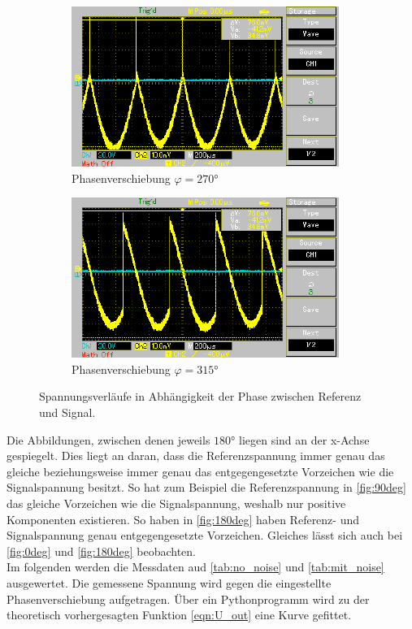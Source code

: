 \begin{figure}
\begin{subfigure}{0.48\textwidth}
        \includegraphics{Oszilloskop_270.pdf}
        \caption{Phasenverschiebung $\varphi = 270°$}
        \label{fig:270deg}
    \end{subfigure}
    \hfill
    \begin{subfigure}{0.48\textwidth}
        \centering
        \includegraphics{Oszilloskop_315.pdf}
        \caption{Phasenverschiebung $\varphi = 315°$}
        \label{fig:315deg}
    \end{subfigure}    
\caption{Spannungsverläufe in Abhängigkeit der Phase zwischen Referenz und Signal.}
\end{figure}

\noindent
Die Abbildungen, zwischen denen jeweils $180°$ liegen sind an der x-Achse gespiegelt. Dies liegt an daran, dass die 
Referenzspannung immer genau das gleiche beziehungsweise immer genau das entgegengesetzte Vorzeichen wie die 
Signalspannung besitzt. So hat zum Beispiel die Referenzspannung in \autoref{fig:90deg} das gleiche Vorzeichen wie die 
Signalspannung, weshalb nur positive Komponenten existieren. So haben in \autoref{fig:180deg} haben Referenz- und 
Signalspannung genau entgegengesetzte Vorzeichen.
Gleiches lässt sich auch bei \autoref{fig:0deg} und \autoref{fig:180deg} beobachten.\\
\noindent
Im folgenden werden die Messdaten aud \autoref{tab:no_noise} und \autoref{tab:mit_noise} ausgewertet. Die gemessene 
Spannung wird gegen die eingestellte Phasenverschiebung aufgetragen. Über ein Pythonprogramm wird zu der 
theoretisch vorhergesagten Funktion \eqref{eqn:U_out} eine Kurve gefittet.

